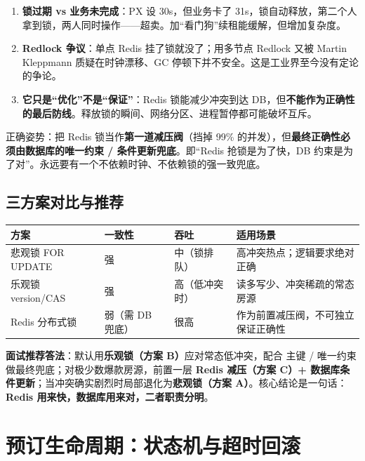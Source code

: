 \begin{pitfall}
\begin{enumerate}
  \item \textbf{锁过期 vs 业务未完成}：PX 设 30s，但业务卡了 31s，锁自动释放，第二个人拿到锁，两人同时操作——超卖。加“看门狗”续租能缓解，但增加复杂度。
  \item \textbf{Redlock 争议}：单点 Redis 挂了锁就没了；用多节点 Redlock 又被 Martin Kleppmann 质疑在时钟漂移、GC 停顿下并不安全。这是工业界至今没有定论的争论。
  \item \textbf{它只是“优化”不是“保证”}：Redis 锁能减少冲突到达 DB，但\textbf{不能作为正确性的最后防线}。释放锁的瞬间、网络分区、进程暂停都可能破坏互斥。
\end{enumerate}
正确姿势：把 Redis 锁当作\textbf{第一道减压阀}（挡掉 99\% 的并发），但\textbf{最终正确性必须由数据库的唯一约束 / 条件更新兜底}。即“Redis 抢锁是为了快，DB 约束是为了对”。永远要有一个不依赖时钟、不依赖锁的强一致兜底。
\end{pitfall}

\subsection{三方案对比与推荐}

\begin{center}
\begin{tabularx}{\linewidth}{@{}l l l X@{}}
\toprule
\textbf{方案} & \textbf{一致性} & \textbf{吞吐} & \textbf{适用场景} \\
\midrule
悲观锁 FOR UPDATE & 强 & 中（锁排队） & 高冲突热点；逻辑要求绝对正确 \\
乐观锁 version/CAS & 强 & 高（低冲突时） & 读多写少、冲突稀疏的常态房源 \\
Redis 分布式锁 & 弱（需 DB 兜底） & 很高 & 作为前置减压阀，不可独立保证正确性 \\
\bottomrule
\end{tabularx}
\end{center}

\textbf{面试推荐答法}：默认用\textbf{乐观锁（方案 B）}应对常态低冲突，配合  主键 / 唯一约束做最终兜底；对极少数爆款房源，前置一层 \textbf{Redis 减压（方案 C）+ 数据库条件更新}；当冲突确实剧烈时局部退化为\textbf{悲观锁（方案 A）}。核心结论是一句话：\textbf{Redis 用来快，数据库用来对，二者职责分明}。

\section{预订生命周期：状态机与超时回滚}

